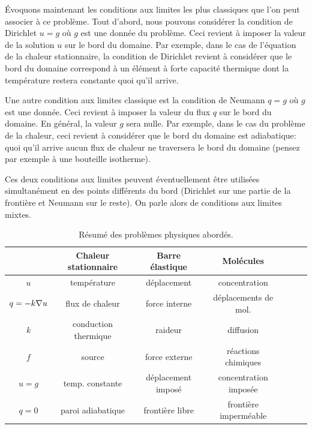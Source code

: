 \documentclass[12pt,a4paper,twoside]{article}
\begin{document}
\'Evoquons maintenant les conditions aux limites les plus classiques
que l'on peut associer \`a ce probl\`eme.
Tout d'abord, nous pouvons consid\'erer la condition de Dirichlet
$u = g$ o\`u $g$ est une donn\'ee du probl\`eme. Ceci revient \`a imposer
la valeur de la solution $u$ sur le bord du domaine.
Par exemple, dans le cas de l'\'equation de la chaleur stationnaire,
la condition de Dirichlet revient \`a consid\'erer que le bord du domaine
correspond \`a un \'el\'ement \`a forte capacit\'e thermique
dont la temp\'erature restera constante quoi qu'il arrive.


Une autre condition aux limites classique est la condition de Neumann
$q = g$ o\`u $g$ est une donn\'ee. Ceci revient \`a imposer la valeur
du flux $q$ sur le bord du domaine.
En g\'en\'eral, la valeur $g$ sera nulle.
Par exemple, dans le cas du probl\`eme de la chaleur, ceci revient
\`a consid\'erer que le bord du domaine est adiabatique:
quoi qu'il arrive aucun flux de chaleur ne traversera le bord du domaine
(pensez par exemple \`a une bouteille isotherme).


Ces deux conditions aux limites peuvent \'eventuellement \^etre utilis\'ees 
simultan\'ement en des points diff\'erents du bord
(Dirichlet sur une partie de la fronti\`ere et Neumann sur le reste).
On parle alors de conditions aux limites mixtes.

\begin{table}[h]
  \centering
  \begin{tabular}{|c|c|c|c|c|c|c|}
    \hline
    &Chaleur stationnaire&Barre \'elastique& Mol\'ecules
    \\
    \hline
    $u$ & temp\'erature & d\'eplacement & concentration
    \\
    \hline
    $q=-k\nabla u$ & flux de chaleur & force interne & d\'eplacements de mol.
    \\
    \hline
    $k$ & conduction thermique & raideur & diffusion
    \\
    \hline
    $f$& source & force externe & r\'eactions chimiques
    \\
    \hline
    $u=g$ & temp. constante & d\'eplacement impos\'e & concentration impos\'ee
    \\
    \hline
    $q=0$ & paroi adiabatique & fronti\`ere libre & fronti\`ere imperm\'eable
    \\
    \hline
  \end{tabular}
  \caption{R\'esum\'e des probl\`emes physiques abord\'es.}
  \label{tab:pb_ell}
\end{table}
\end{document}

